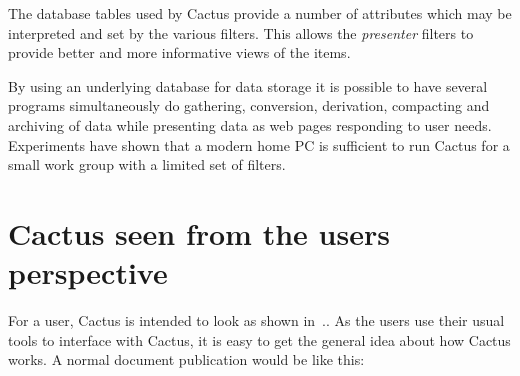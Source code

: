 The database tables used by Cactus provide a number of
attributes which may be interpreted and set by the various
filters.  This allows the \textit{presenter} filters to
provide better and more informative views of the items.

By using an underlying database for data storage it is
possible to have several programs simultaneously do
gathering, conversion, derivation, compacting and
archiving of data while presenting data as web pages
responding to user needs. Experiments have shown that a
modern home PC is sufficient to run Cactus for a small work
group with a limited set of filters.




\section{Cactus seen from the users perspective}
\label{sec:cactus-seen-from-the-users-perspective}



For a user, Cactus is intended to look as shown
in~..  As the users use their usual tools to
interface with Cactus, it is easy to get the general idea about how
Cactus works. A normal document publication would be like this:

  

